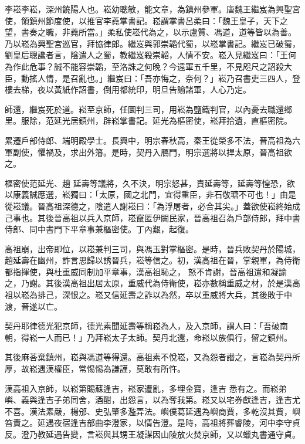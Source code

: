 
\begin{pinyinscope}

 李崧李崧，深州饒陽人也。崧幼聰敏，能文章，為鎮州參軍。唐魏王繼岌為興聖宮使，領鎮州節度使，以推官李蕘掌書記。崧謂掌書呂柔曰：「魏王皇子，天下之望，書奏之職，非蕘所當。」柔私使崧代為之，以示盧質、馮道，道等皆以為善。乃以崧為興聖宮巡官，拜協律郎。繼岌與郭崇韜代蜀，以崧掌書記。繼岌已破蜀，劉皇后聰讒者言，陰遣人之蜀，教繼岌殺崇韜，人情不安。崧入見繼岌曰：「王何
 為作此危事？誠不能容崇韜，至洛誅之何晚？今遠軍五千里，不見咫尺之詔殺大臣，動搖人情，是召亂也。」繼岌曰：「吾亦悔之，奈何？」崧乃召書吏三四人，登樓去梯，夜以黃紙作詔書，倒用都統印，明旦告諭諸軍，人心乃定。



 師還，繼岌死於道。崧至京師，任圜判三司，用崧為鹽鐵判官，以內憂去職還鄉里。服除，范延光居鎮州，辟崧掌書記。延光為樞密使，崧拜拾遺，直樞密院。



 累遷戶部侍郎、端明殿學士。長興中，明宗春秋高，秦王從榮多不法，晉高祖為六軍副使，懼禍及，求出外籓。是時，契丹入鴈門，明宗選將以捍太原，晉高祖欲之。



 樞密使范延光、趙
 延壽等議將，久不決，明宗怒甚，責延壽等，延壽等惶恐，欲以康義誠應選，崧獨曰：「太原，國之北門，宜得重臣，非石敬瑭不可也！」由是從崧議。晉高祖深德之，陰遣人謝崧曰：「為浮屠者，必合其尖。」蓋欲使崧終始成己事也。其後晉高祖以兵入京師，崧竄匿伊闕民家，晉高祖召為戶部侍郎，拜中書侍郎、同中書門下平章事兼樞密使。丁內艱，起復。



 高祖崩，出帝即位，以崧兼判三司，與馮玉對掌樞密。是時，晉兵敗契丹於陽城，趙延壽在幽州，詐言思歸以誘晉兵，崧等信之。初，漢高祖在晉，掌親軍，為侍衛都指揮使，與杜重威同制加平章事，漢高祖恥之，
 怒不肯謝，晉高祖遣和凝諭之，乃謝。其後漢高祖出居太原，重威代為侍衛使，崧亦數稱重威之材，於是漢高祖以崧為排己，深恨之。崧又信延壽之詐以為然，卒以重威將大兵，其後敗于中渡，晉遂以亡。



 契丹耶律德光犯京師，德光素聞延壽等稱崧為人，及入京師，謂人曰：「吾破南朝，得崧一人而已！」乃拜崧太子太師。契丹北還，命崧以族俱行，留之鎮州。



 其後麻荅棄鎮州，崧與馮道等得還。高祖素不悅崧，又為怨者譖之，言崧為契丹所厚，故崧遇漢權臣，常惕惕為謙謹，莫敢有所忤。



 漢高祖入京師，以崧第賜蘇逢吉，崧家遭亂，多埋金寶，逢吉
 悉有之。而崧弟嶼、義與逢吉子弟同舍，酒酣，出怨言，以為奪我第。崧又以宅券獻逢吉，逢吉尤不喜。漢法素嚴，楊邠、史弘肇多濫弄法。嶼僕葛延遇為嶼商賈，多乾沒其貲，嶼笞責之。延遇夜宿逢吉部曲李澄家，以情告澄。是時，高祖將葬睿陵，河中李守貞反。澄乃教延遇告變，言崧與其甥王凝謀因山陵放火焚京師，又以蠟丸書通守貞。




\end{pinyinscope}
